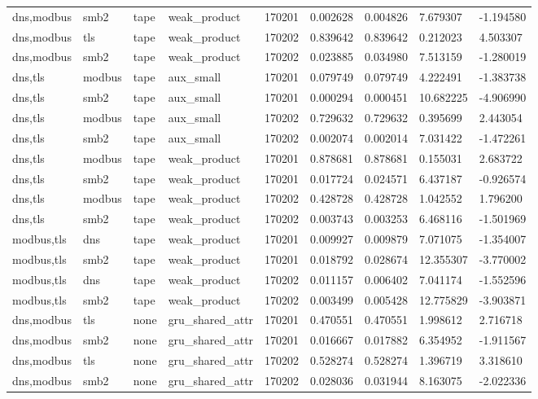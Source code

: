\begin{tabular}{lllllllll}
dns,modbus & smb2 & tape & weak\_product & 170201 & 0.002628 & 0.004826 & 7.679307 & -1.194580 \\
dns,modbus & tls & tape & weak\_product & 170202 & 0.839642 & 0.839642 & 0.212023 & 4.503307 \\
dns,modbus & smb2 & tape & weak\_product & 170202 & 0.023885 & 0.034980 & 7.513159 & -1.280019 \\
dns,tls & modbus & tape & aux\_small & 170201 & 0.079749 & 0.079749 & 4.222491 & -1.383738 \\
dns,tls & smb2 & tape & aux\_small & 170201 & 0.000294 & 0.000451 & 10.682225 & -4.906990 \\
dns,tls & modbus & tape & aux\_small & 170202 & 0.729632 & 0.729632 & 0.395699 & 2.443054 \\
dns,tls & smb2 & tape & aux\_small & 170202 & 0.002074 & 0.002014 & 7.031422 & -1.472261 \\
dns,tls & modbus & tape & weak\_product & 170201 & 0.878681 & 0.878681 & 0.155031 & 2.683722 \\
dns,tls & smb2 & tape & weak\_product & 170201 & 0.017724 & 0.024571 & 6.437187 & -0.926574 \\
dns,tls & modbus & tape & weak\_product & 170202 & 0.428728 & 0.428728 & 1.042552 & 1.796200 \\
dns,tls & smb2 & tape & weak\_product & 170202 & 0.003743 & 0.003253 & 6.468116 & -1.501969 \\
modbus,tls & dns & tape & weak\_product & 170201 & 0.009927 & 0.009879 & 7.071075 & -1.354007 \\
modbus,tls & smb2 & tape & weak\_product & 170201 & 0.018792 & 0.028674 & 12.355307 & -3.770002 \\
modbus,tls & dns & tape & weak\_product & 170202 & 0.011157 & 0.006402 & 7.041174 & -1.552596 \\
modbus,tls & smb2 & tape & weak\_product & 170202 & 0.003499 & 0.005428 & 12.775829 & -3.903871 \\
dns,modbus & tls & none & gru\_shared\_attr & 170201 & 0.470551 & 0.470551 & 1.998612 & 2.716718 \\
dns,modbus & smb2 & none & gru\_shared\_attr & 170201 & 0.016667 & 0.017882 & 6.354952 & -1.911567 \\
dns,modbus & tls & none & gru\_shared\_attr & 170202 & 0.528274 & 0.528274 & 1.396719 & 3.318610 \\
dns,modbus & smb2 & none & gru\_shared\_attr & 170202 & 0.028036 & 0.031944 & 8.163075 & -2.022336 \\

\end{tabular}
